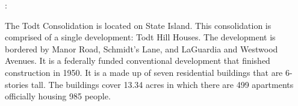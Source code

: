 :       

     

The Todt Consolidation is located on State Island. This consolidation is comprised of a single development: Todt Hill Houses. The development is bordered by Manor Road, Schmidt's Lane, and LaGuardia and Westwood Avenues. It is a federally funded conventional development that finished construction in 1950. It is a made up of seven residential buildings that are 6- stories tall. The buildings cover 13.34 acres in which there are 499 apartments officially housing 985 people.   

 

 